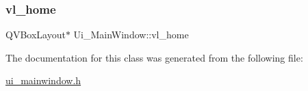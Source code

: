 \subsubsection{\texorpdfstring{vl\+\_\+home}{vl\_home}}
{\footnotesize\ttfamily Q\+V\+Box\+Layout$\ast$ Ui\+\_\+\+Main\+Window\+::vl\+\_\+home}



The documentation for this class was generated from the following file\+:\begin{DoxyCompactItemize}
\item 
\hyperlink{ui__mainwindow_8h}{ui\+\_\+mainwindow.\+h}\end{DoxyCompactItemize}
